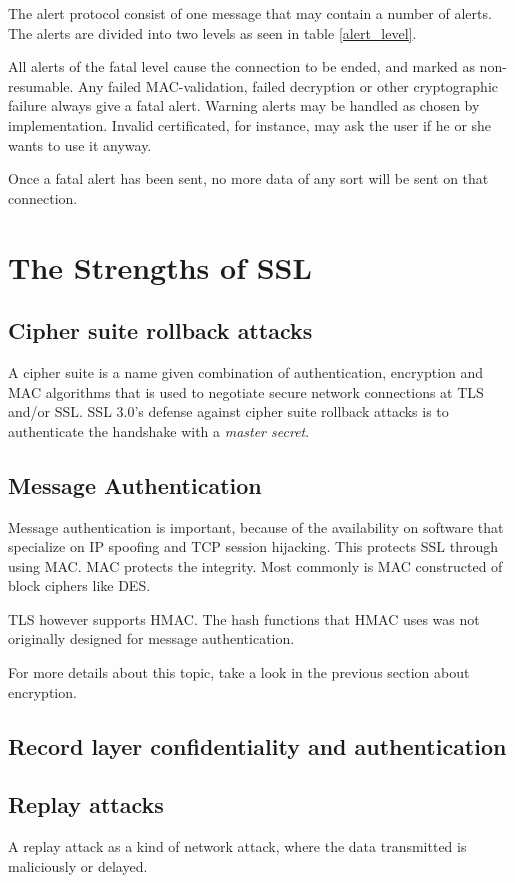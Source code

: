 \documentclass[11pt,a4paper, twocolumn]{article}
\begin{document}
The alert protocol consist of one message that may contain a number of alerts. The alerts are divided into two levels as seen in table \ref{alert_level}.

All alerts of the fatal level cause the connection to be ended, and marked as non-resumable. Any failed MAC-validation, failed decryption or other cryptographic failure always give a fatal alert. Warning alerts may be handled as chosen by implementation. Invalid certificated, for instance, may ask the user if he or she wants to use it anyway.

Once a fatal alert has been sent, no more data of any sort will be sent on that connection.


\section{The Strengths of SSL}

\subsection{Cipher suite rollback attacks}
A cipher suite is a name given combination of authentication, encryption and MAC algorithms that is used to negotiate secure network connections at TLS and/or SSL.
SSL 3.0's defense against cipher suite rollback attacks is to authenticate the handshake with a \textit{master secret}.

\subsection{Message Authentication}
Message authentication is important, because of the availability on software that specialize on IP spoofing and TCP session hijacking. This protects SSL through using MAC. MAC protects the integrity. Most commonly is MAC constructed of block ciphers like DES.

TLS however supports HMAC. The hash functions that HMAC uses was not originally designed for message authentication.

For more details about this topic, take a look in the previous section about encryption.

\subsection{Record layer confidentiality and authentication}

\subsection{Replay attacks}
A replay attack as a kind of network attack, where the data transmitted is maliciously or delayed. 
\end{document}
